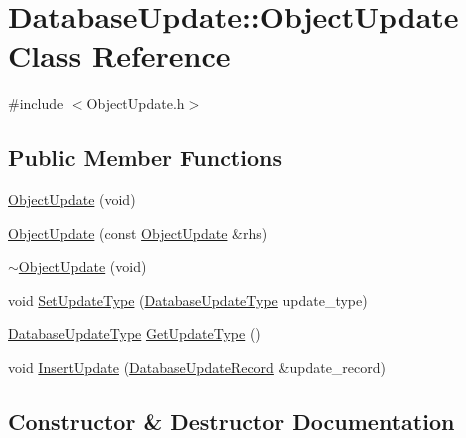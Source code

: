 \hypertarget{class_database_update_1_1_object_update}{}\section{Database\+Update\+:\+:Object\+Update Class Reference}
\label{class_database_update_1_1_object_update}


{\ttfamily \#include $<$Object\+Update.\+h$>$}

\subsection*{Public Member Functions}
\begin{DoxyCompactItemize}
\item 
\hyperlink{class_database_update_1_1_object_update_a1753327f6c2ff3b6ce494f5bf07a5789}{Object\+Update} (void)
\item 
\hyperlink{class_database_update_1_1_object_update_a87eef44fe1f3b50c5718a45c0bd84a12}{Object\+Update} (const \hyperlink{class_database_update_1_1_object_update}{Object\+Update} \&rhs)
\item 
\hyperlink{class_database_update_1_1_object_update_ad39c13a1cad6d22ae7a79f86c525eaec}{$\sim$\+Object\+Update} (void)
\item 
void \hyperlink{class_database_update_1_1_object_update_ad2599c9037f289b7f23de977d95d81c2}{Set\+Update\+Type} (\hyperlink{namespace_database_update_ae6c52e997ff1fee40dea9a47376e54a1}{Database\+Update\+Type} update\+\_\+type)
\item 
\hyperlink{namespace_database_update_ae6c52e997ff1fee40dea9a47376e54a1}{Database\+Update\+Type} \hyperlink{class_database_update_1_1_object_update_a19820bb17c19fccf77267d5313e5fe28}{Get\+Update\+Type} ()
\item 
void \hyperlink{class_database_update_1_1_object_update_aa14a32a39b376f6f95de2a9f373b8e13}{Insert\+Update} (\hyperlink{class_database_update_1_1_database_update_record}{Database\+Update\+Record} \&update\+\_\+record)
\end{DoxyCompactItemize}


\subsection{Constructor \& Destructor Documentation}
\hypertarget{class_database_update_1_1_object_update_a1753327f6c2ff3b6ce494f5bf07a5789}{}
